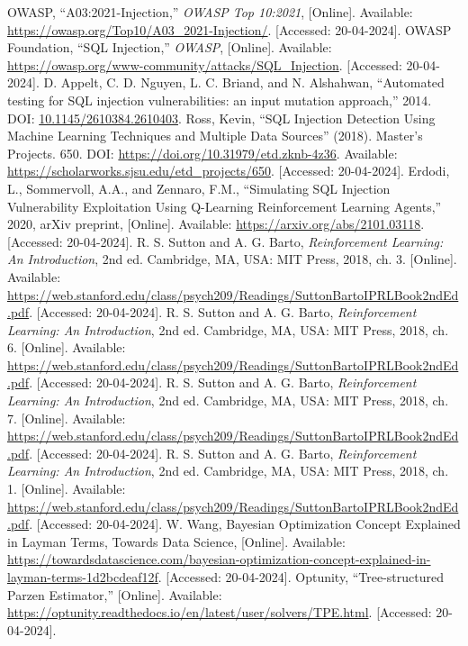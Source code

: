 \documentclass[conference]{IEEEtran}
\begin{document}
\begin{thebibliography}{00}
 OWASP, ``A03:2021-Injection,'' \textit{OWASP Top 10:2021}, [Online]. Available: \url{https://owasp.org/Top10/A03_2021-Injection/}. [Accessed: 20-04-2024].
 OWASP Foundation, ``SQL Injection,'' \textit{OWASP}, [Online]. Available: \url{https://owasp.org/www-community/attacks/SQL_Injection}. [Accessed: 20-04-2024].
 D. Appelt, C. D. Nguyen, L. C. Briand, and N. Alshahwan, ``Automated testing for SQL injection vulnerabilities: an input mutation approach,'' 2014. DOI: \url{10.1145/2610384.2610403}.
 Ross, Kevin, ``SQL Injection Detection Using Machine Learning Techniques and Multiple Data Sources'' (2018). Master's Projects. 650. DOI: \url{https://doi.org/10.31979/etd.zknb-4z36}. Available: \url{https://scholarworks.sjsu.edu/etd_projects/650}. [Accessed: 20-04-2024].
 Erdodi, L., Sommervoll, A.A., and Zennaro, F.M., ``Simulating SQL Injection Vulnerability Exploitation Using Q-Learning Reinforcement Learning Agents,'' 2020, arXiv preprint, [Online]. Available: \url{https://arxiv.org/abs/2101.03118}. [Accessed: 20-04-2024].
 R. S. Sutton and A. G. Barto, \textit{Reinforcement Learning: An Introduction}, 2nd ed. Cambridge, MA, USA: MIT Press, 2018, ch. 3. [Online]. Available: \url{https://web.stanford.edu/class/psych209/Readings/SuttonBartoIPRLBook2ndEd.pdf}. [Accessed: 20-04-2024].
 R. S. Sutton and A. G. Barto, \textit{Reinforcement Learning: An Introduction}, 2nd ed. Cambridge, MA, USA: MIT Press, 2018, ch. 6. [Online]. Available: \url{https://web.stanford.edu/class/psych209/Readings/SuttonBartoIPRLBook2ndEd.pdf}. [Accessed: 20-04-2024].
 R. S. Sutton and A. G. Barto, \textit{Reinforcement Learning: An Introduction}, 2nd ed. Cambridge, MA, USA: MIT Press, 2018, ch. 7. [Online]. Available: \url{https://web.stanford.edu/class/psych209/Readings/SuttonBartoIPRLBook2ndEd.pdf}. [Accessed: 20-04-2024].
 R. S. Sutton and A. G. Barto, \textit{Reinforcement Learning: An Introduction}, 2nd ed. Cambridge, MA, USA: MIT Press, 2018, ch. 1. [Online]. Available: \url{https://web.stanford.edu/class/psych209/Readings/SuttonBartoIPRLBook2ndEd.pdf}. [Accessed: 20-04-2024].
 W. Wang, Bayesian Optimization Concept Explained in Layman Terms, Towards Data Science, [Online]. Available: \url{https://towardsdatascience.com/bayesian-optimization-concept-explained-in-layman-terms-1d2bcdeaf12f}. [Accessed: 20-04-2024].
 Optunity, ``Tree-structured Parzen Estimator,'' [Online]. Available: \url{https://optunity.readthedocs.io/en/latest/user/solvers/TPE.html}. [Accessed: 20-04-2024].
\end{thebibliography}
\end{document}

